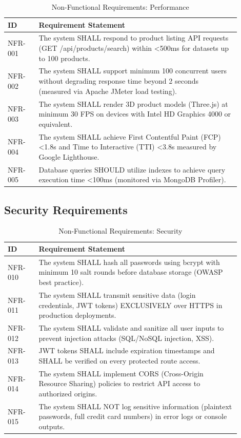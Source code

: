 \documentclass[12pt, a4paper]{report}
\begin{document}
\begin{table}[H]
\centering
\caption{Non-Functional Requirements: Performance}
\label{tab:nfr_performance}
\small
\begin{tabular}{@{}p{0.12\linewidth}p{0.78\linewidth}@{}}
\toprule
\textbf{ID} & \textbf{Requirement Statement} \\
\midrule
NFR-001 & The system SHALL respond to product listing API requests (GET /api/products/search) within \textless 500ms for datasets up to 100 products. \\
NFR-002 & The system SHALL support minimum 100 concurrent users without degrading response time beyond 2 seconds (measured via Apache JMeter load testing). \\
NFR-003 & The system SHALL render 3D product models (Three.js) at minimum 30 FPS on devices with Intel HD Graphics 4000 or equivalent. \\
NFR-004 & The system SHALL achieve First Contentful Paint (FCP) \textless 1.8s and Time to Interactive (TTI) \textless 3.8s measured by Google Lighthouse. \\
NFR-005 & Database queries SHOULD utilize indexes to achieve query execution time \textless 100ms (monitored via MongoDB Profiler). \\
\bottomrule
\end{tabular}
\end{table}

\subsection{Security Requirements}

\begin{table}[H]
\centering
\caption{Non-Functional Requirements: Security}
\label{tab:nfr_security}
\small
\begin{tabular}{@{}p{0.12\linewidth}p{0.78\linewidth}@{}}
\toprule
\textbf{ID} & \textbf{Requirement Statement} \\
\midrule
NFR-010 & The system SHALL hash all passwords using bcrypt with minimum 10 salt rounds before database storage (OWASP best practice). \\
NFR-011 & The system SHALL transmit sensitive data (login credentials, JWT tokens) EXCLUSIVELY over HTTPS in production deployments. \\
NFR-012 & The system SHALL validate and sanitize all user inputs to prevent injection attacks (SQL/NoSQL injection, XSS). \\
NFR-013 & JWT tokens SHALL include expiration timestamps and SHALL be verified on every protected route access. \\
NFR-014 & The system SHALL implement CORS (Cross-Origin Resource Sharing) policies to restrict API access to authorized origins. \\
NFR-015 & The system SHALL NOT log sensitive information (plaintext passwords, full credit card numbers) in error logs or console outputs. \\
\bottomrule
\end{tabular}
\end{table}
\end{document}
